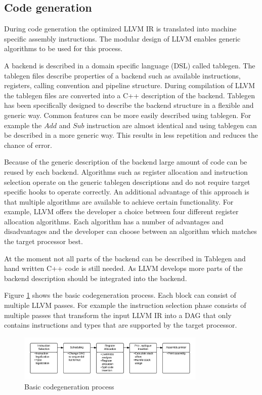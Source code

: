 \subsection{Code generation}
During code generation the optimized LLVM IR is translated into machine specific assembly instructions. The modular design of LLVM enables generic algorithms to be used for this process. 

A backend is described in a domain specific language (DSL) called tablegen. The tablegen files describe properties of a backend such as available instructions, registers, calling convention and pipeline structure. During compilation of LLVM the tablegen files are converted into a C++ description of the backend. Tablegen has been specifically designed to describe the backend structure in a flexible and generic way. Common features can be more easily described using tablegen. For example the $Add$ and $Sub$ instruction are almost identical and using tablegen can be described in a more generic way. This results in less repetition and reduces the chance of error.

Because of the generic description of the backend large amount of code can be reused by each backend. Algorithms such as register allocation and instruction selection operate on the generic tablegen descriptions and do not require target specific hooks to operate correctly. An additional advantage of this approach is that multiple algorithms are available to achieve certain functionality. For example, LLVM offers the developer a choice between four different register allocation algorithms. Each algorithm has a number of advantages and disadvantages and the developer can choose between an algorithm which matches the target processor best.

At the moment not all parts of the backend can be described in Tablegen and hand written C++ code is still needed. As LLVM develops more parts of the backend description should be integrated into the backend. 

Figure \ref{fig:codegen_process} shows the basic codegeneration process. Each block can consist of multiple LLVM passes. For example the instruction selection phase consists of multiple passes that transform the input LLVM IR into a DAG that only contains instructions and types that are supported by the target processor.
\begin{figure}[ph!]
\centering
\includegraphics[width=0.8\textwidth]{2_background/img/Codegen.png}
\caption{Basic codegeneration process}
\label{fig:codegen_process}
\end{figure}

